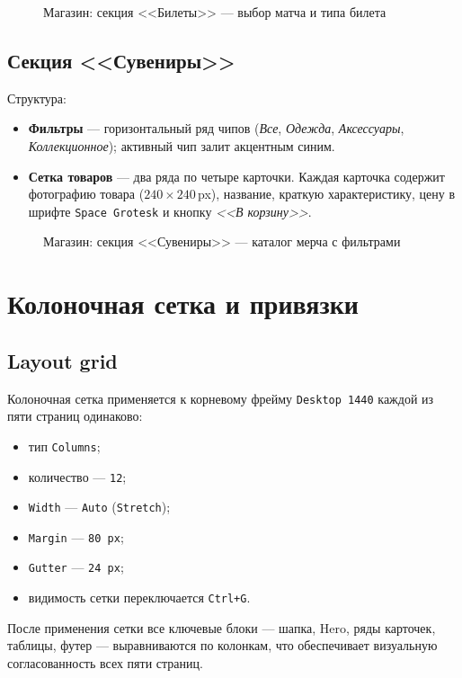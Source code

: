 \begin{figure}[h]
  \centering
  \caption{Магазин: секция <<Билеты>> --- выбор матча и типа билета}
  \label{fig:shop_tickets}
\end{figure}

\subsection{Секция <<Сувениры>>}

Структура:
\begin{itemize}
  \item \textbf{Фильтры} --- горизонтальный ряд чипов
        (\textit{Все}, \textit{Одежда}, \textit{Аксессуары},
        \textit{Коллекционное}); активный чип залит акцентным
        синим.
  \item \textbf{Сетка товаров} --- два ряда по четыре карточки.
        Каждая карточка содержит фотографию товара
        (\(240\times240\,\)px), название, краткую характеристику,
        цену в шрифте \texttt{Space~Grotesk} и кнопку
        \textit{<<В корзину>>}.
\end{itemize}

\begin{figure}[h]
  \centering
  \caption{Магазин: секция <<Сувениры>> --- каталог мерча с фильтрами}
  \label{fig:shop_merch}
\end{figure}

\section{Колоночная сетка и привязки}

\subsection{Layout grid}

Колоночная сетка применяется к корневому фрейму \texttt{Desktop~1440}
каждой из пяти страниц одинаково:
\begin{itemize}
  \item тип \texttt{Columns};
  \item количество --- \texttt{12};
  \item \texttt{Width} --- \texttt{Auto} (\texttt{Stretch});
  \item \texttt{Margin} --- \texttt{80\,px};
  \item \texttt{Gutter} --- \texttt{24\,px};
  \item видимость сетки переключается \texttt{Ctrl+G}.
\end{itemize}
После применения сетки все ключевые блоки --- шапка, Hero, ряды
карточек, таблицы, футер --- выравниваются по колонкам, что
обеспечивает визуальную согласованность всех пяти страниц.

